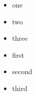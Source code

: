 \begin{itemize}
  \item one
  \item two
  \item three
\end{itemize}

\begin{itemize}
  \item first
  \item second
  \item third
\end{itemize}
